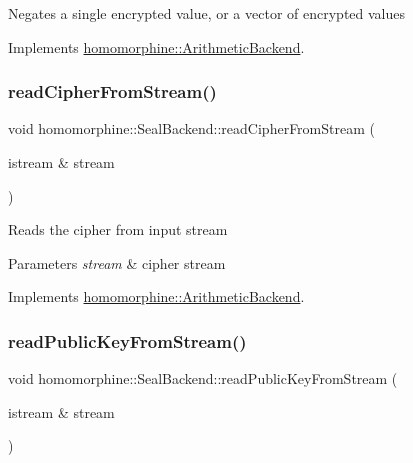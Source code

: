 Negates a single encrypted value, or a vector of encrypted values 

Implements \hyperlink{classhomomorphine_1_1_arithmetic_backend_ad27913060534c42b5812a1e4cf21475f}{homomorphine\+::\+Arithmetic\+Backend}.

\mbox{\label{classhomomorphine_1_1_seal_backend_a2b6704607e71b72122d3820b750f1bee}} 
\subsubsection{\texorpdfstring{read\+Cipher\+From\+Stream()}{readCipherFromStream()}}
{\footnotesize\ttfamily void homomorphine\+::\+Seal\+Backend\+::read\+Cipher\+From\+Stream (\begin{DoxyParamCaption}\item[{istream \&}]{stream }\end{DoxyParamCaption})\hspace{0.3cm}{\ttfamily [virtual]}}

Reads the cipher from input stream


\begin{DoxyParams}{Parameters}
{\em stream} & cipher stream \\
\hline
\end{DoxyParams}


Implements \hyperlink{classhomomorphine_1_1_arithmetic_backend_ac8fe4568424c616b653a955b172c480b}{homomorphine\+::\+Arithmetic\+Backend}.

\mbox{\label{classhomomorphine_1_1_seal_backend_a5bcb7f49667f2a2e095690fdec484b51}} 
\subsubsection{\texorpdfstring{read\+Public\+Key\+From\+Stream()}{readPublicKeyFromStream()}}
{\footnotesize\ttfamily void homomorphine\+::\+Seal\+Backend\+::read\+Public\+Key\+From\+Stream (\begin{DoxyParamCaption}\item[{istream \&}]{stream }\end{DoxyParamCaption})\hspace{0.3cm}{\ttfamily [virtual]}}

